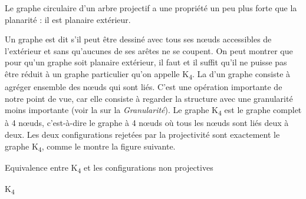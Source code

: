 {    Le graphe circulaire d’un arbre projectif a une propriété un peu plus forte que la planarité : il est planaire extérieur.
    
    {Un graphe est dit  s’il peut être dessiné avec tous ses nœuds accessibles de l’extérieur et sans qu’aucunes de ses arêtes ne se coupent.}
    On peut montrer que pour qu’un graphe soit planaire extérieur, il faut et il suffit qu’il ne puisse pas être réduit à un graphe particulier qu’on appelle K\textsubscript{4}. La  d’un graphe consiste à agréger ensemble des nœuds qui sont liés. C’est une opération importante de notre point de vue, car elle consiste à regarder la structure avec une granularité moins importante (voir la  sur la \textit{Granularité}). Le graphe K\textsubscript{4} est le graphe complet à 4 nœuds, c’est-à-dire le graphe à 4 nœuds où tous les nœuds sont liés deux à deux. Les deux configurations rejetées par la projectivité sont exactement le graphe K\textsubscript{4}, comme le montre la figure suivante.

    \ea
    Equivalence entre K\textsubscript{4} et les configurations non projectives\\
    \begin{multicols}{3}\raggedcolumns
    \ea{}
    \columnbreak
    \ex{}
    \columnbreak
    \ex K\textsubscript{4}\\
    \z
    \end{multicols}
    \z
}

